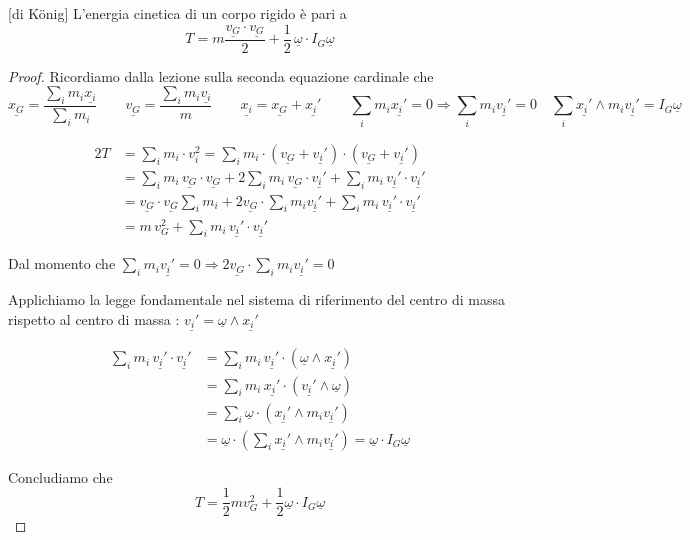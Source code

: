 \begin{theorem}{}[di König]
L'energia cinetica di un corpo rigido è pari a
\[
T=m\frac{\underline{v_G}\cdot\underline{v_G}}{2}+\frac{1}{2}\,\underline{\omega}\cdot I_G\underline{\omega}
\]
\end{theorem}

\begin{proof}
Ricordiamo dalla lezione sulla seconda equazione cardinale che
\[
\underline{x_G}=\frac{\sum_i m_i\underline{x_i}}{\sum_i m_i}
\qquad
\underline{v_G}=\frac{\sum_i m_i\underline{v_i}}{m}
\qquad
\underline{x_i}=\underline{x_G}+\underline{x_i'}
\qquad
\sum_i m_i\underline{x_i'}=0 \Rightarrow \sum_i m_i\underline{v_i'}=0
\quad
\sum_i \underline{x_i'}\wedge m_i\underline{v_i'}=I_G\underline{\omega}
\]

\begin{align*}
2T
&=\sum_i m_i\cdot v_i^2
=\sum_i m_i\cdot(\underline{v_G}+\underline{v_i'})\cdot(\underline{v_G}+\underline{v_i'}) \\
&=\sum_i m_i\,\underline{v_G}\cdot\underline{v_G}
+2\sum_i m_i\,\underline{v_G}\cdot\underline{v_i'}
+\sum_i m_i\,\underline{v_i'}\cdot\underline{v_i'} \\
&=\underline{v_G}\cdot\underline{v_G}\sum_i m_i
+2\underline{v_G}\cdot\sum_i m_i\underline{v_i'}
+\sum_i m_i\,\underline{v_i'}\cdot\underline{v_i'} \\
&=m\,v_G^2+\sum_i m_i\,\underline{v_i'}\cdot\underline{v_i'}
\end{align*}

Dal momento che \(\sum_i m_i\underline{v_i'}=0 \Rightarrow 2\underline{v_G}\cdot\sum_i m_i\underline{v_i'}=0\)

Applichiamo la legge fondamentale nel sistema di riferimento del centro di massa rispetto al centro di massa : \(\underline{v_i'}=\underline{\omega}\wedge\underline{x_i'}\)

\begin{align*}
\sum_i m_i\,\underline{v_i'}\cdot\underline{v_i'}
&=\sum_i m_i\,\underline{v_i'}\cdot(\underline{\omega}\wedge\underline{x_i'}) \\
&=\sum_i m_i\,\underline{x_i'}\cdot(\underline{v_i'}\wedge\underline{\omega}) \\
&=\sum_i \underline{\omega}\cdot(\underline{x_i'}\wedge m_i\underline{v_i'}) \\
&=\underline{\omega}\cdot\left(\sum_i \underline{x_i'}\wedge m_i\underline{v_i'}\right)
=\underline{\omega}\cdot I_G\underline{\omega}
\end{align*}

Concludiamo che
\[
T=\frac{1}{2}mv_G^2+\frac{1}{2}\underline{\omega}\cdot I_G\underline{\omega}
\]
\end{proof}

